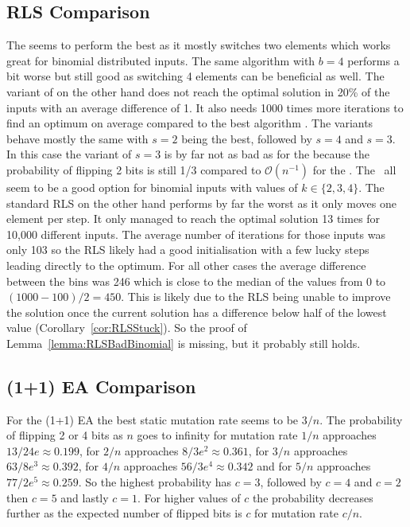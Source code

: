 \subsection{RLS Comparison}

The \RLSN[2] seems to perform the best as it mostly switches two elements which works great for binomial distributed inputs.
The same algorithm with $b=4$ performs a bit worse but still good as switching 4 elements can be beneficial as well.
The variant of \RLSN[3] on the other hand does not reach the optimal solution in 20\% of the inputs with an average difference of 1.
It also needs 1000 times more iterations to find an optimum on average compared to the best algorithm \RLSN[2].
The \RLSR[s] variants behave mostly the same with $s=2$ being the best, followed by $s=4$ and $s=3$.
In this case the variant of $s=3$ is by far not as bad as for the \RLSN[3] because the probability of flipping 2 bits is still 1/3 compared to $\mathcal{O}(n^{-1})$ for the \RLSN[3].
The \RLSR~all seem to be a good option for binomial inputs with values of $k\in\{2,3,4\}$.
The standard RLS on the other hand performs by far the worst as it only moves one element per step.
It only managed to reach the optimal solution 13 times for 10,000 different inputs.
The average number of iterations for those inputs was only 103 so the RLS likely had a good initialisation with a few lucky steps leading directly to the optimum.
For all other cases the average difference between the bins was 246 which is close to the median of the values from 0 to $(1000-100)/2=450$.
This is likely due to the RLS being unable to improve the solution once the current solution has a difference below half of the lowest value (Corollary~\ref{cor:RLSStuck}).
So the proof of Lemma~\ref{lemma:RLSBadBinomial} is missing, but it probably still holds.
\subsection{(1+1) EA Comparison}
For the (1+1) EA the best static mutation rate seems to be $3/n$.
The probability of flipping 2 or 4 bits as $n$ goes to infinity for mutation rate $1/n$ approaches $13/24e\approx 0.199$, for $2/n$ approaches $8/3e^2\approx 0.361$, for $3/n$ approaches $63/8e^3\approx 0.392$, for $4/n$ approaches $56/3e^4\approx 0.342$ and for $5/n$ approaches $77/2e^5\approx 0.259$.
So the highest probability has $c=3$, followed by $c=4$ and $c=2$ then $c=5$ and lastly $c=1$.
For higher values of $c$ the probability decreases further as the expected number of flipped bits is $c$ for mutation rate $c/n$.

